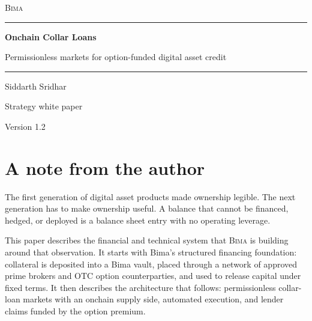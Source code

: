 \documentclass[11pt,oneside]{article}
\newcommand{\Bima}{\textsc{Bima}}
\begin{document}
\begin{titlepage}
\thispagestyle{empty}
\vspace*{0.88in}
\begin{center}
{\large\textsc{Bima}}\par
\vspace{0.34in}
\rule{0.72\textwidth}{0.5pt}\par
\vspace{0.38in}
 {\fontsize{27}{33}\selectfont\bfseries Onchain Collar Loans}\par
\vspace{0.16in}
{\large Permissionless markets for option-funded digital asset credit}\par
\vspace{0.38in}
\rule{0.28\textwidth}{0.5pt}\par
\vfill
{\normalsize Siddarth Sridhar}\par
\vspace{0.12in}
{\small Strategy white paper}\par
\vspace{0.28in}
 {\small Version 1.2}\par
\end{center}
\end{titlepage}

\tableofcontents
\newpage
{}

\section*{A note from the author}

The first generation of digital asset products made ownership legible. The next generation has to make ownership useful. A balance that cannot be financed, hedged, or deployed is a balance sheet entry with no operating leverage.

This paper describes the financial and technical system that \Bima{} is building around that observation. It starts with Bima's structured financing foundation: collateral is deposited into a Bima vault, placed through a network of approved prime brokers and OTC option counterparties, and used to release capital under fixed terms. It then describes the architecture that follows: permissionless collar-loan markets with an onchain supply side, automated execution, and lender claims funded by the option premium.
\end{document}
